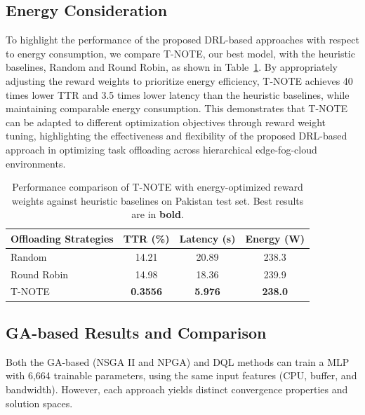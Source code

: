 \documentclass[preprint,3p,authoryear]{elsarticle}
\begin{document}
\subsection{Energy Consideration}\label{sec:energy_consideration}

To highlight the performance of the proposed DRL-based approaches with respect to energy consumption, we compare T-NOTE, our best model, with the heuristic baselines, Random and Round Robin, as shown in Table~\ref{tab:energy_comparison}. By appropriately adjusting the reward weights to prioritize energy efficiency, T-NOTE achieves 40 times lower TTR and 3.5 times lower latency than the heuristic baselines, while maintaining comparable energy consumption. This demonstrates that T-NOTE can be adapted to different optimization objectives through reward weight tuning, highlighting the effectiveness and flexibility of the proposed DRL-based approach in optimizing task offloading across hierarchical edge-fog-cloud environments.

\begin{table}[htbp]
\centering

\begin{tabular}{lccc}
\textbf{Offloading Strategies} & \textbf{TTR (\%)} & \textbf{Latency (s)} & \textbf{Energy (W)} \\
\hline
Random 
 & 14.21
 & 20.89
 & 238.3 \\
 
Round Robin 
 & 14.98
 & 18.36
 & 239.9 \\
 
T-NOTE 
 & \textbf{0.3556} 
 & \textbf{5.976} 
 & \textbf{238.0} \\

\end{tabular}

\caption{Performance comparison of T-NOTE with energy-optimized reward weights against heuristic baselines on Pakistan test set. Best results are in \textbf{bold}.}
\label{tab:energy_comparison}
\end{table}



\subsection{GA-based Results and Comparison}\label{subsec:ga_vs_DQL}

Both the GA-based (NSGA II and NPGA) and DQL methods can train a MLP with 6,664 trainable parameters, using the same input features (CPU, buffer, and bandwidth). However, each approach yields distinct convergence properties and solution spaces.
\end{document}
